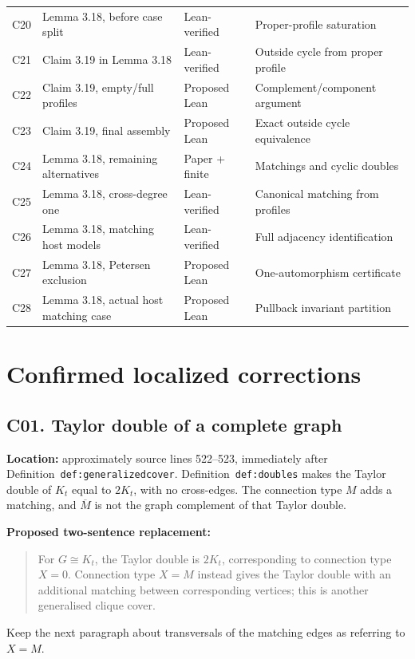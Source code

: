 \documentclass[11pt,a4paper]{article}
\begin{document}
\begin{longtable}{@{}p{15mm}p{66mm}p{32mm}p{35mm}@{}}
C20 & Lemma 3.18, before case split & Lean-verified & Proper-profile saturation\\
C21 & Claim 3.19 in Lemma 3.18 & Lean-verified & Outside cycle from proper profile\\
C22 & Claim 3.19, empty/full profiles & Proposed Lean & Complement/component argument\\
C23 & Claim 3.19, final assembly & Proposed Lean & Exact outside cycle equivalence\\
C24 & Lemma 3.18, remaining alternatives & Paper + finite & Matchings and cyclic doubles\\
C25 & Lemma 3.18, cross-degree one & Lean-verified & Canonical matching from profiles\\
C26 & Lemma 3.18, matching host models & Lean-verified & Full adjacency identification\\
C27 & Lemma 3.18, Petersen exclusion & Proposed Lean & One-automorphism certificate\\
C28 & Lemma 3.18, actual host matching case & Proposed Lean & Pullback invariant partition\\
\bottomrule
\end{longtable}

\section*{Confirmed localized corrections}

\subsection*{C01. Taylor double of a complete graph}
\textbf{Location:} approximately source lines 522--523, immediately
after Definition~\texttt{def:generalizedcover}.
Definition~\texttt{def:doubles} makes the Taylor double of
\(K_t\) equal to \(2K_t\), with no cross-edges. The connection
type \(M\) adds a matching, and \(\overline M\) is not the
graph complement of that Taylor double.

\textbf{Proposed two-sentence replacement:}
\begin{quote}
For \(G\cong K_t\), the Taylor double is \(2K_t\),
corresponding to connection type \(X=0\).
Connection type \(X=M\) instead gives the Taylor double
with an additional matching between corresponding vertices;
this is another generalised clique cover.
\end{quote}
Keep the next paragraph about transversals of the matching
edges as referring to \(X=M\).
\end{document}
